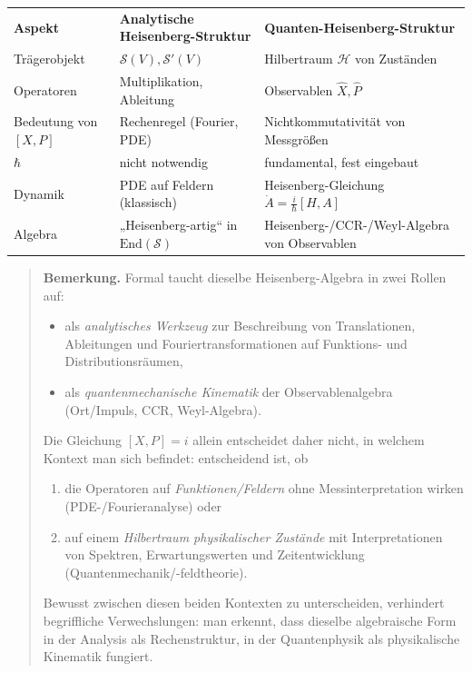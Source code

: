 \documentclass[10pt, letterpaper]{article}
\newcommand{\End}{\mathrm{End}}
\begin{document}
\begin{center}
\begin{tabular}{lll}
\textbf{Aspekt} & \textbf{Analytische Heisenberg-Struktur} & \textbf{Quanten-Heisenberg-Struktur} \\[4pt]
Trägerobjekt & \(\mathcal{S}(V),\mathcal{S}'(V)\) & Hilbertraum \(\mathcal{H}\) von Zuständen \\[4pt]
Operatoren & Multiplikation, Ableitung & Observablen \(\hat X,\hat P\) \\[4pt]
Bedeutung von \([X,P]\) & Rechenregel (Fourier, PDE) & Nichtkommutativität von Messgrößen \\[4pt]
\(\hbar\) & nicht notwendig & fundamental, fest eingebaut \\[4pt]
Dynamik & PDE auf Feldern (klassisch) & Heisenberg-Gleichung \(\dot A = \tfrac{i}{\hbar}[H,A]\) \\[4pt]
Algebra & „Heisenberg-artig“ in \(\End(\mathcal{S})\) & Heisenberg-/CCR-/Weyl-Algebra von Observablen
\end{tabular}
\end{center}

\begin{quote}
\textbf{Bemerkung.}
Formal taucht dieselbe Heisenberg-Algebra in zwei Rollen auf:
\begin{itemize}
  \item als \emph{analytisches Werkzeug} zur Beschreibung von Translationen,
        Ableitungen und Fouriertransformationen auf Funktions- und Distributionsräumen,
  \item als \emph{quantenmechanische Kinematik} der Observablenalgebra
        (Ort/Impuls, CCR, Weyl-Algebra).
\end{itemize}
Die Gleichung \([X,P]=i\) allein entscheidet daher nicht,
in welchem Kontext man sich befindet:
entscheidend ist, ob
\begin{enumerate}
  \item die Operatoren auf \emph{Funktionen/Feldern} ohne Messinterpretation wirken
        (PDE-/Fourieranalyse) oder
  \item auf einem \emph{Hilbertraum physikalischer Zustände} mit\linebreak
        Interpretationen von Spektren, Erwartungswerten und Zeitentwicklung
        (Quantenmechanik/-feldtheorie).
\end{enumerate}
Bewusst zwischen diesen beiden Kontexten zu unterscheiden,
verhindert begriffliche Verwechslungen:
man erkennt, dass dieselbe algebraische Form
in der Analysis als Rechenstruktur,
in der Quantenphysik als physikalische Kinematik fungiert.
\end{quote}
\end{document}
